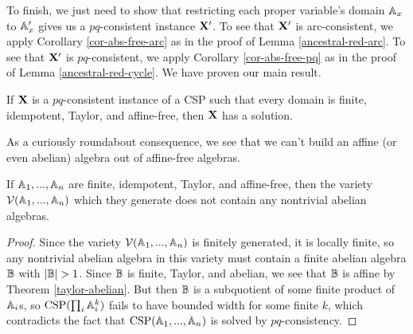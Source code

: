 \documentclass[letterpaper,11pt]{article}
\DeclareMathOperator{\CSP}{CSP}
\DeclareMathOperator{\Con}{Con}
\begin{document}
To finish, we just need to show that restricting each proper variable's domain $\mathbb{A}_x$ to $\mathbb{A}_x'$ gives us a $pq$-consistent instance $\mathbf{X}'$. To see that $\mathbf{X}'$ is arc-consistent, we apply Corollary \ref{cor-abs-free-arc} as in the proof of Lemma \ref{ancestral-red-arc}. To see that $\mathbf{X}'$ is $pq$-consistent, we apply Corollary \ref{cor-abs-free-pq} as in the proof of Lemma \ref{ancestral-red-cycle}. We have proven our main result.

\begin{thm}\label{affine-free-pq} If $\mathbf{X}$ is a $pq$-consistent instance of a CSP such that every domain is finite, idempotent, Taylor, and affine-free, then $\mathbf{X}$ has a solution.
\end{thm}

\begin{comment}
In fact, we have the following slight strengthening of Kozik's result.

\begin{thm} Suppose that $\fX$ is a $pq$-consistent instance of a CSP such that every domain is finite, idempotent, Taylor, and affine-free. If $x$ is a variable with domain $\bA_x$, then for any element $a \in \bA_x$ such that there is a sequence of subalgebras $\bA_x = \bA_0 \supseteq \cdots \supseteq \bA_n = \{a\}$ such that for each $i$ either $\bA_{i+1}$ is a minimal absorbing subalgebra of $\bA_i$ or $\bA_{i+1}$ is a congruence class of a congruence $\theta \in \Con(\bA_i)$ such that $\bA_i/\theta$ is polynomially complete and $\bA_i$ is absorption free, there is a solution to the instance $\fX$ in which $x$ is assigned the value $a$.
\end{thm}
\end{comment}

As a curiously roundabout consequence, we see that we can't build an affine (or even abelian) algebra out of affine-free algebras.

\begin{cor}\label{affine-free-variety} If $\mathbb{A}_1, ..., \mathbb{A}_n$ are finite, idempotent, Taylor, and affine-free, then the variety $\mathcal{V}(\mathbb{A}_1, ..., \mathbb{A}_n)$ which they generate does not contain any nontrivial abelian algebras.
\end{cor}
\begin{proof} Since the variety $\mathcal{V}(\mathbb{A}_1, ..., \mathbb{A}_n)$ is finitely generated, it is locally finite, so any nontrivial abelian algebra in this variety must contain a finite abelian algebra $\mathbb{B}$ with $|\mathbb{B}| > 1$. Since $\mathbb{B}$ is finite, Taylor, and abelian, we see that $\mathbb{B}$ is affine by Theorem \ref{taylor-abelian}. But then $\mathbb{B}$ is a subquotient of some finite product of $\mathbb{A}_i$s, so $\CSP(\prod_i \bA_i^k)$ fails to have bounded width for some finite $k$, which contradicts the fact that $\CSP(\bA_1, ..., \bA_n)$ is solved by $pq$-consistency.
\end{proof}
\end{document}
